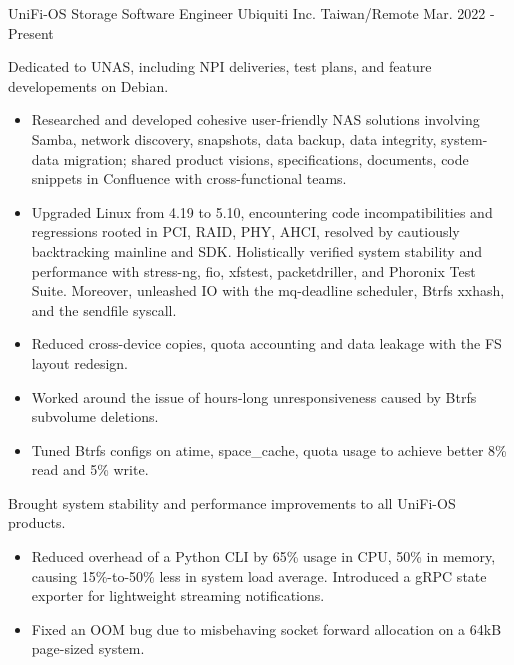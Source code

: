 

\begin{cventries}

  \cventry
    {UniFi-OS Storage Software Engineer} %
    {Ubiquiti Inc.} %
    {Taiwan/Remote} %
    {Mar. 2022 - Present} %
    {
      \begin{cvitems} %
        \item Dedicated to UNAS, including NPI deliveries, test plans, and
          feature developements on Debian.
        \begin{itemize}
          \item Researched and developed cohesive user-friendly NAS solutions
            involving Samba, network discovery, snapshots, data backup, data
            integrity, system-data migration; shared product visions,
            specifications, documents, code snippets in Confluence with
            cross-functional teams.
          \item Upgraded Linux from 4.19 to 5.10, encountering code
            incompatibilities and regressions rooted in PCI, RAID, PHY, AHCI,
            resolved by cautiously backtracking mainline and SDK. Holistically
            verified system stability and performance with stress-ng, fio,
            xfstest, packetdriller, and Phoronix Test Suite. Moreover,
            unleashed IO with the mq-deadline scheduler, Btrfs xxhash, and the
            sendfile syscall.
          \item Reduced cross-device copies, quota accounting and data leakage
            with the FS layout redesign.
          \item Worked around the issue of hours-long unresponsiveness caused
            by Btrfs subvolume deletions.
          \item Tuned Btrfs configs on atime, space\_cache, quota usage to
            achieve better 8\% read and 5\% write.
        \end{itemize}
        \item Brought system stability and performance improvements to all
          UniFi-OS products.
        \begin{itemize}
          \item Reduced overhead of a Python CLI by 65\% usage in CPU, 50\% in
            memory, causing 15\%-to-50\% less in system load average.
            Introduced a gRPC state exporter for lightweight streaming
            notifications.
          \item Fixed an OOM bug due to misbehaving socket forward allocation on
            a 64kB page-sized system.
        \end{itemize}
      \end{cvitems}
    }


\end{cventries}
